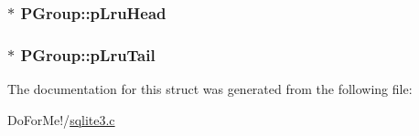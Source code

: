 \hypertarget{struct_p_group_a3d8ff5ee67a873462209676d0fc4c5a2}{
\subsubsection[{p\-Lru\-Head}]{$\ast$ P\-Group\-::p\-Lru\-Head}}\label{struct_p_group_a3d8ff5ee67a873462209676d0fc4c5a2}
\hypertarget{struct_p_group_a2c58c2f107352bccedc6e49b5f07a486}{
\subsubsection[{p\-Lru\-Tail}]{ $\ast$ P\-Group\-::p\-Lru\-Tail}}\label{struct_p_group_a2c58c2f107352bccedc6e49b5f07a486}


The documentation for this struct was generated from the following file\-:\begin{DoxyCompactItemize}
\item 
Do\-For\-Me!/\hyperlink{sqlite3_8c}{sqlite3.\-c}\end{DoxyCompactItemize}
